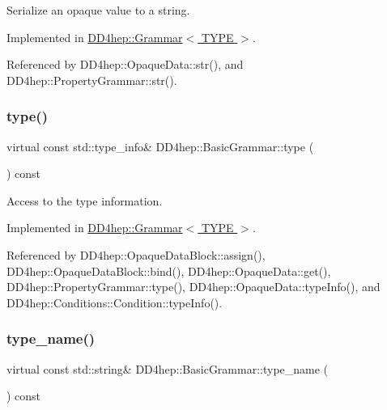 Serialize an opaque value to a string. 



Implemented in \hyperlink{class_d_d4hep_1_1_grammar_a405a9e6504ed0c6dc5a774cf4839447c}{D\+D4hep\+::\+Grammar$<$ T\+Y\+P\+E $>$}.



Referenced by D\+D4hep\+::\+Opaque\+Data\+::str(), and D\+D4hep\+::\+Property\+Grammar\+::str().

\hypertarget{class_d_d4hep_1_1_basic_grammar_a697d38c53f67a86bb182350dad284402}{}\label{class_d_d4hep_1_1_basic_grammar_a697d38c53f67a86bb182350dad284402} 
\subsubsection{\texorpdfstring{type()}{type()}}
{\footnotesize\ttfamily virtual const std\+::type\+\_\+info\& D\+D4hep\+::\+Basic\+Grammar\+::type (\begin{DoxyParamCaption}{ }\end{DoxyParamCaption}) const\hspace{0.3cm}{\ttfamily [pure virtual]}}



Access to the type information. 



Implemented in \hyperlink{class_d_d4hep_1_1_grammar_aff59cecd068a31460b5323552fd711ce}{D\+D4hep\+::\+Grammar$<$ T\+Y\+P\+E $>$}.



Referenced by D\+D4hep\+::\+Opaque\+Data\+Block\+::assign(), D\+D4hep\+::\+Opaque\+Data\+Block\+::bind(), D\+D4hep\+::\+Opaque\+Data\+::get(), D\+D4hep\+::\+Property\+Grammar\+::type(), D\+D4hep\+::\+Opaque\+Data\+::type\+Info(), and D\+D4hep\+::\+Conditions\+::\+Condition\+::type\+Info().

\hypertarget{class_d_d4hep_1_1_basic_grammar_acae3770beb2e60eaf76c7d85722c8bc2}{}\label{class_d_d4hep_1_1_basic_grammar_acae3770beb2e60eaf76c7d85722c8bc2} 
\subsubsection{\texorpdfstring{type\+\_\+name()}{type\_name()}}
{\footnotesize\ttfamily virtual const std\+::string\& D\+D4hep\+::\+Basic\+Grammar\+::type\+\_\+name (\begin{DoxyParamCaption}{ }\end{DoxyParamCaption}) const\hspace{0.3cm}{\ttfamily [pure virtual]}}



